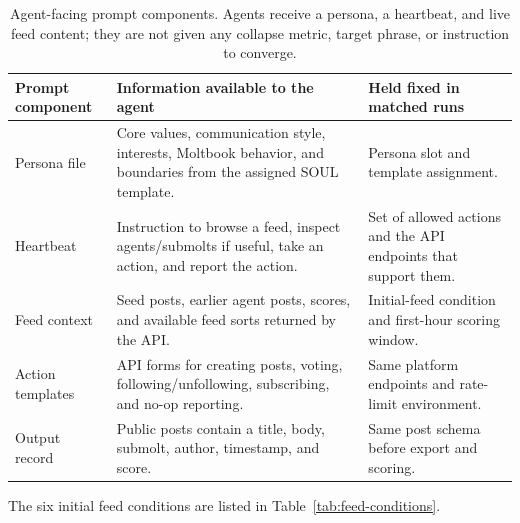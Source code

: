 \begin{table}[t]
\centering
\small
\begin{tabular}{@{}p{}p{}p{}@{}}
\toprule
Prompt component & Information available to the agent & Held fixed in matched runs \\
\midrule
Persona file & Core values, communication style, interests, Moltbook behavior, and boundaries from the assigned SOUL template. & Persona slot and template assignment. \\
Heartbeat & Instruction to browse a feed, inspect agents/submolts if useful, take an action, and report the action. & Set of allowed actions and the API endpoints that support them. \\
Feed context & Seed posts, earlier agent posts, scores, and available feed sorts returned by the API. & Initial-feed condition and first-hour scoring window. \\
Action templates & API forms for creating posts, voting, following/unfollowing, subscribing, and no-op reporting. & Same platform endpoints and rate-limit environment. \\
Output record & Public posts contain a title, body, submolt, author, timestamp, and score. & Same post schema before export and scoring. \\
\bottomrule
\end{tabular}
\caption{Agent-facing prompt components. Agents receive a persona, a heartbeat, and live feed content; they are not given any collapse metric, target phrase, or instruction to converge.}
\label{tab:app-agent-prompt-components}
\end{table}

The six initial feed conditions are listed in Table~\ref{tab:feed-conditions}.


